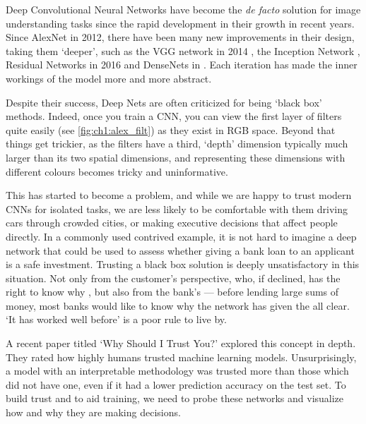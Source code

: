 Deep Convolutional Neural Networks have become the \emph{de facto} solution for
image understanding tasks since the rapid development in their growth in recent
years. Since AlexNet\cite{krizhevsky_imagenet_2012} in 2012, there have been
many new improvements in their design, taking them `deeper', such as the
VGG network in 2014 \cite{simonyan_very_2014}, the Inception Network
\cite{szegedy_going_2015}, Residual Networks in 2016
\cite{he_deep_2016} and DenseNets in \cite{huang_densely_2017}. Each iteration
has made the inner workings of the model more and more abstract.

Despite their success, Deep Nets are often criticized for being `black box'
methods. Indeed, once you train a CNN, you can view the first layer of filters
quite easily (see \autoref{fig:ch1:alex_filt}) as they exist in RGB
space. Beyond that things get trickier, as the filters have a third, `depth'
dimension typically much larger than its two spatial dimensions, and
representing these dimensions with different colours becomes tricky and
uninformative.

This has started to become a problem, and while we are happy to trust modern
CNNs for isolated tasks, we are less likely to be comfortable with them driving
cars through crowded cities, or making executive decisions that affect people
directly. In a commonly used contrived example, it is not hard to imagine a deep
network that could be used to assess whether giving a bank loan to an applicant
is a safe investment. Trusting a black box solution is deeply unsatisfactory in
this situation. Not only from the customer's perspective, who, if declined, has
the right to know why \cite{goodman_european_2016}, but
also from the bank's --- before lending large sums of money, most banks
would like to know why the network has given the all clear. `It has worked well
before' is a poor rule to live by.

A recent paper titled `Why Should I Trust You?' \cite{ribeiro_why_2016}
explored this concept in depth. They rated how highly humans trusted machine
learning models. Unsurprisingly, a model with an interpretable methodology
was trusted more than those which did not have one, even if it had a lower
prediction accuracy on the test set. 
To build trust and to aid training, we need to probe these networks and
visualize how and why they are making decisions.

